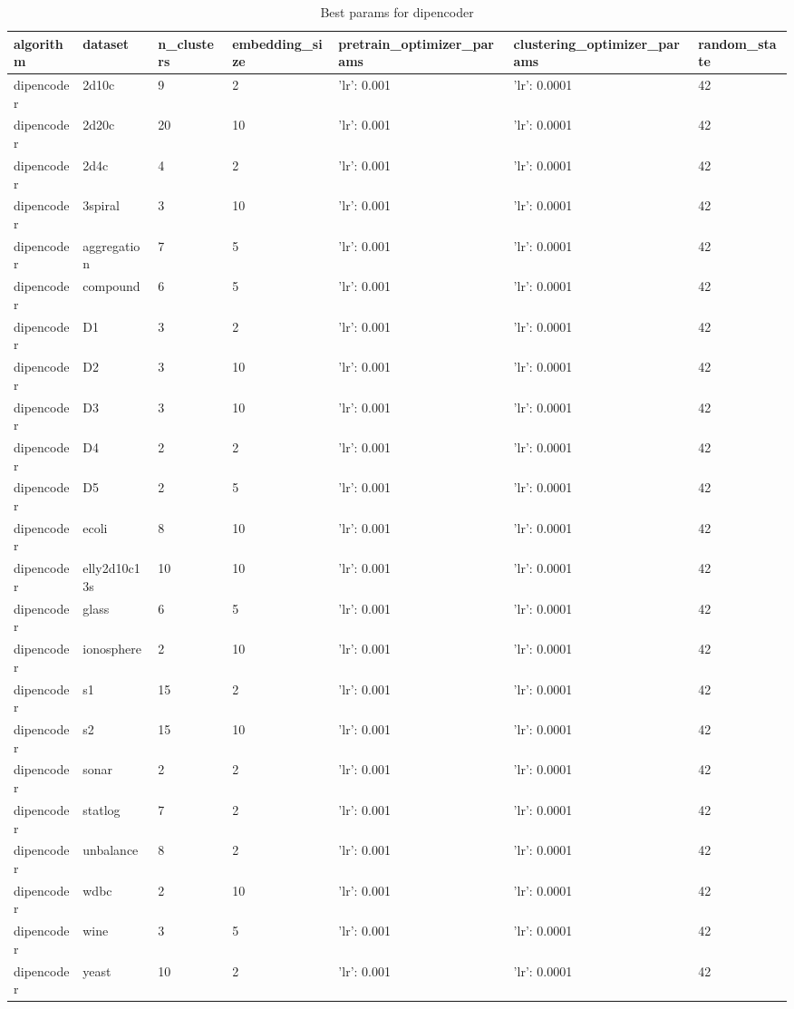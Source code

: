 \begin{table}[H]
\centering
\caption{Best params for dipencoder}
\label{tab:params:dipencoder}
\begin{tabular}{|l|l|l|l|l|l|l|}
\hline
algorithm & dataset & n\_clusters & embedding\_size & pretrain\_optimizer\_params & clustering\_optimizer\_params & random\_state \\
\hline
dipencoder & 2d10c & 9 & 2 & {'lr': 0.001} & {'lr': 0.0001} & 42 \\
\hline
dipencoder & 2d20c & 20 & 10 & {'lr': 0.001} & {'lr': 0.0001} & 42 \\
\hline
dipencoder & 2d4c & 4 & 2 & {'lr': 0.001} & {'lr': 0.0001} & 42 \\
\hline
dipencoder & 3spiral & 3 & 10 & {'lr': 0.001} & {'lr': 0.0001} & 42 \\
\hline
dipencoder & aggregation & 7 & 5 & {'lr': 0.001} & {'lr': 0.0001} & 42 \\
\hline
dipencoder & compound & 6 & 5 & {'lr': 0.001} & {'lr': 0.0001} & 42 \\
\hline
dipencoder & D1 & 3 & 2 & {'lr': 0.001} & {'lr': 0.0001} & 42 \\
\hline
dipencoder & D2 & 3 & 10 & {'lr': 0.001} & {'lr': 0.0001} & 42 \\
\hline
dipencoder & D3 & 3 & 10 & {'lr': 0.001} & {'lr': 0.0001} & 42 \\
\hline
dipencoder & D4 & 2 & 2 & {'lr': 0.001} & {'lr': 0.0001} & 42 \\
\hline
dipencoder & D5 & 2 & 5 & {'lr': 0.001} & {'lr': 0.0001} & 42 \\
\hline
dipencoder & ecoli & 8 & 10 & {'lr': 0.001} & {'lr': 0.0001} & 42 \\
\hline
dipencoder & elly2d10c13s & 10 & 10 & {'lr': 0.001} & {'lr': 0.0001} & 42 \\
\hline
dipencoder & glass & 6 & 5 & {'lr': 0.001} & {'lr': 0.0001} & 42 \\
\hline
dipencoder & ionosphere & 2 & 10 & {'lr': 0.001} & {'lr': 0.0001} & 42 \\
\hline
dipencoder & s1 & 15 & 2 & {'lr': 0.001} & {'lr': 0.0001} & 42 \\
\hline
dipencoder & s2 & 15 & 10 & {'lr': 0.001} & {'lr': 0.0001} & 42 \\
\hline
dipencoder & sonar & 2 & 2 & {'lr': 0.001} & {'lr': 0.0001} & 42 \\
\hline
dipencoder & statlog & 7 & 2 & {'lr': 0.001} & {'lr': 0.0001} & 42 \\
\hline
dipencoder & unbalance & 8 & 2 & {'lr': 0.001} & {'lr': 0.0001} & 42 \\
\hline
dipencoder & wdbc & 2 & 10 & {'lr': 0.001} & {'lr': 0.0001} & 42 \\
\hline
dipencoder & wine & 3 & 5 & {'lr': 0.001} & {'lr': 0.0001} & 42 \\
\hline
dipencoder & yeast & 10 & 2 & {'lr': 0.001} & {'lr': 0.0001} & 42 \\
\hline
\end{tabular}
\end{table}